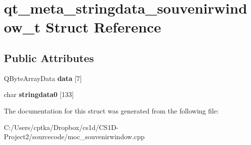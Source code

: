 \hypertarget{structqt__meta__stringdata__souvenirwindow__t}{}\section{qt\+\_\+meta\+\_\+stringdata\+\_\+souvenirwindow\+\_\+t Struct Reference}
\label{structqt__meta__stringdata__souvenirwindow__t}
\subsection*{Public Attributes}
\begin{DoxyCompactItemize}
\item 
\mbox{\label{structqt__meta__stringdata__souvenirwindow__t_ad8241397809fe617211f3e9cc2285b37}} 
Q\+Byte\+Array\+Data {\bfseries data} \mbox{[}7\mbox{]}
\item 
\mbox{\label{structqt__meta__stringdata__souvenirwindow__t_a368f4ffe5dea333d48a73b122bebe4be}} 
char {\bfseries stringdata0} \mbox{[}133\mbox{]}
\end{DoxyCompactItemize}


The documentation for this struct was generated from the following file\+:\begin{DoxyCompactItemize}
\item 
C\+:/\+Users/cptka/\+Dropbox/cs1d/\+C\+S1\+D-\/\+Project2/sourcecode/moc\+\_\+souvenirwindow.\+cpp\end{DoxyCompactItemize}
